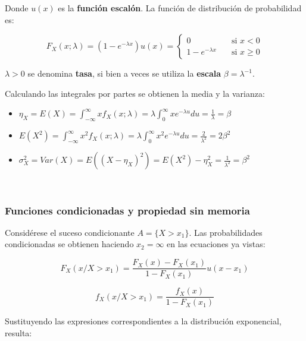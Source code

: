 \documentclass[11pt]{article}
\providecommand{\tightlist}{%
      \setlength{\itemsep}{0pt}\setlength{\parskip}{0pt}}
\begin{document}
Donde \(u(x)\) es la \textbf{función escalón}. La función de
distribución de probabilidad es:

\[
F_X(x;\lambda) = (1-e^{-\lambda x})u(x) = 
\begin{cases}
    0                   & \quad \text{si } x < 0 \\
    1-e^{-\lambda x} & \quad \text{si } x \geq 0
\end{cases}
\]

\(\lambda > 0\) se denomina \textbf{tasa}, si bien a veces se utiliza la
\textbf{escala} \(\beta = \lambda^{-1}\).

    Calculando las integrales por partes se obtienen la media y la varianza:

\begin{itemize}
\tightlist
\item
  \(\eta_X = E(X) = \int_{-\infty}^{\infty} xf_X(x;\lambda)= \lambda \int_0^\infty xe^{-\lambda u}du=\frac{1}{\lambda}=\beta\)
\item
  \(E(X^2)= \int_{-\infty}^{\infty} x^2f_X(x;\lambda)= \lambda \int_0^\infty x^2e^{-\lambda u}du=\frac{2}{\lambda^2}=2\beta^2\)
\item
  \(\sigma_X^2 = Var(X) = E((X-\eta_X)^2) = E(X^2)-\eta_X^2=\frac{1}{\lambda^2}=\beta^2\)
\end{itemize}

    \begin{center}
    \end{center}
    { \hspace*{\fill} \\}
    
    \hypertarget{funciones-condicionadas-y-propiedad-sin-memoria}{%
\subsubsection*{Funciones condicionadas y propiedad sin
memoria}\label{funciones-condicionadas-y-propiedad-sin-memoria}}

Considérese el suceso condicionante \(A=\{X>x_1\}\). Las probabilidades
condicionadas se obtienen haciendo \(x_2=\infty\) en las ecuaciones ya
vistas:

\[
F_X(x/X>x_1) = \frac{F_X(x)-F_X(x_1)}{1-F_X(x_1)}u(x-x_1)
\]

\[
f_X(x/X>x_1) = \frac{f_X(x)}{1-F_X(x_1)}
\]

    Sustituyendo las expresiones correspondientes a la distribución
exponencial, resulta:
\end{document}
